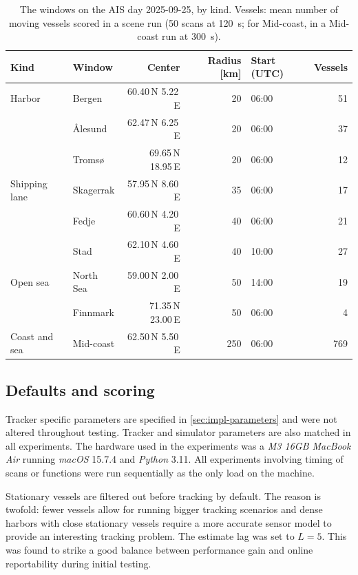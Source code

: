 \begin{table}[htbp]
\centering
\caption{The windows on the AIS day 2025-09-25, by kind. Vessels: mean number of moving vessels scored in a scene run (50 scans at 120~s; for Mid-coast, in a Mid-coast run at 300~s).}
\label{tab:exp-windows}
\small
\begin{tabular}{l l r r l r}
\toprule
Kind & Window & Center & Radius [km] & Start (UTC) & Vessels \\
\midrule
Harbor & Bergen & 60.40\,N 5.22\,E & 20 & 06:00 & 51 \\
 & Ålesund & 62.47\,N 6.25\,E & 20 & 06:00 & 37 \\
 & Tromsø & 69.65\,N 18.95\,E & 20 & 06:00 & 12 \\
\addlinespace
Shipping lane & Skagerrak & 57.95\,N 8.60\,E & 35 & 06:00 & 17 \\
 & Fedje & 60.60\,N 4.20\,E & 40 & 06:00 & 21 \\
 & Stad & 62.10\,N 4.60\,E & 40 & 10:00 & 27 \\
\addlinespace
Open sea & North Sea & 59.00\,N 2.00\,E & 50 & 14:00 & 19 \\
 & Finnmark & 71.35\,N 23.00\,E & 50 & 06:00 & 4 \\
\addlinespace
Coast and sea & Mid-coast & 62.50\,N 5.50\,E & 250 & 06:00 & 769 \\
\bottomrule
\end{tabular}
\end{table}

\subsection{Defaults and scoring}
\label{sec:exp-scoring}
\label{sec:exp-defaults}

Tracker specific parameters are specified in \autoref{sec:impl-parameters} and were not altered throughout testing. Tracker and simulator parameters are also matched in all experiments. The hardware used in the experiments was a \textit{M3 16GB MacBook Air} running \textit{macOS} 15.7.4 and \textit{Python} 3.11. All experiments involving timing of scans or functions were run sequentially as the only load on the machine. 
\medskip

Stationary vessels are filtered out before tracking by default. The reason is twofold: fewer vessels allow for running bigger tracking scenarios and dense harbors with close stationary vessels require a more accurate sensor model to provide an interesting tracking problem. The estimate lag was set to $L = 5$. This was found to strike a good balance between performance gain and online reportability during initial testing.

